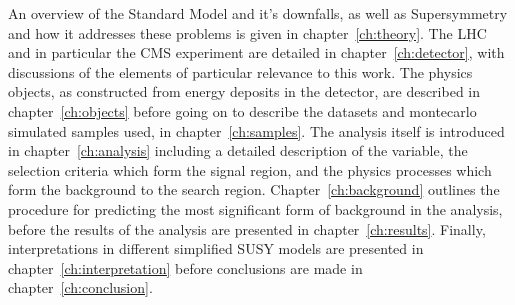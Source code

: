 An overview of the Standard Model and it's downfalls, as well as Supersymmetry
and how it addresses these problems is given in chapter~\ref{ch:theory}. The LHC
and in
particular the CMS experiment are detailed in chapter~\ref{ch:detector}, with
discussions of the elements of particular relevance to this work. The physics
objects, as constructed from energy deposits in the detector, are described in
chapter~\ref{ch:objects} before going on to describe the datasets and montecarlo
simulated samples used, in chapter~\ref{ch:samples}. The analysis itself is
introduced in chapter~\ref{ch:analysis} including a detailed description of the
\alphat variable, the selection criteria which form the signal region, and the
physics processes which form the background to the search region.
Chapter~\ref{ch:background} outlines the procedure for predicting the most
significant form of background in the analysis, before the results of the
analysis are presented in chapter~\ref{ch:results}. Finally, interpretations in
different simplified SUSY models are presented in
chapter~\ref{ch:interpretation} before conclusions are made in
chapter~\ref{ch:conclusion}.